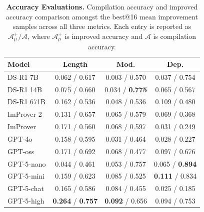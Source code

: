 \begin{table}
\centering
\caption{\textbf{Accuracy Evaluations.} Compilation accuracy and improved accuracy comparison amongst the best@16 mean improvement samples across all three metrics. Each entry is reported as $\mathcal{A}_\mu^+ / \mathcal{A}$, where $\mathcal{A}_\mu^+$ is improved accuracy and $\mathcal{A}$ is compilation accuracy.}
\small
\setlength{\tabcolsep}{5pt}
\begin{tabular}{l|ccc}
\hline
\textbf{Model} & \textbf{Length} & \textbf{Mod.} & \textbf{Dep.} \\
\hline
DS-R1 7B      & 0.062 / 0.617 & 0.003 / 0.570 & 0.037 / 0.754 \\
DS-R1 14B     & 0.075 / 0.660 & 0.034 / \textbf{0.775} & 0.065 / 0.567 \\
DS-R1 671B  & 0.162 / 0.536 & 0.048 / 0.536 & 0.109 / 0.480 \\
\hline
ImProver 2 & 0.131 / 0.657 & 0.065 / 0.579 & 0.069 / 0.368 \\
\hline
ImProver            & 0.171 / 0.560 & 0.068 / 0.597 & 0.031 / 0.249 \\
GPT-4o              & 0.158 / 0.595 & 0.031 / 0.464 & 0.028 / 0.227 \\
GPT-oss        & 0.171 / 0.692 & 0.068 / 0.477 & 0.097 / 0.676 \\
GPT-5-nano          & 0.044 / 0.461 & 0.053 / 0.757 & 0.065 / \textbf{0.894} \\
GPT-5-mini          & 0.159 / 0.623 & 0.085 / 0.525 & \textbf{0.111} / 0.834 \\
GPT-5-chat          & 0.165 / 0.586 & 0.084 / 0.455 & 0.025 / 0.185 \\
GPT-5-high          & \textbf{0.264} / \textbf{0.757} & \textbf{0.092} / 0.656 & 0.094 / 0.753 \\
\hline
\end{tabular}
\label{tab:acc}
\end{table}


